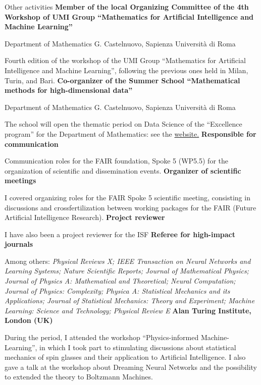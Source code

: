 \begin{rubric}{Other activities}
  \textbf{Member of the local Organizing Committee of the 4th Workshop of UMI Group ``Mathematics for Artificial Intelligence and Machine Learning''}\par Department of Mathematics G. Castelnuovo, Sapienza Università di Roma\par Fourth edition of the workshop of the UMI Group “Mathematics for Artificial Intelligence and Machine Learning”, following the previous ones held in Milan, Turin, and Bari.
  \textbf{Co-organizer of the Summer School ``Mathematical methods for high-dimensional data''}\par Department of Mathematics G. Castelnuovo, Sapienza Università di Roma\par The school will open the thematic period on Data Science of the ``Excellence program'' for the Department of Mathematics: see the \href{https://sites.google.com/view/math-high-dimensional-data/home}{website.}
\entry*[2024 -- today]
  \textbf{Responsible for communication}\par Communication roles for the FAIR foundation, Spoke 5 (WP5.5) for the organization of scientific and dissemination events.
\entry*[2024]
  \textbf{Organizer of scientific meetings}\par I covered organizing roles for the FAIR Spoke 5 scientific meeting, consisting in discussions and crossfertilization between working packages for the FAIR (Future Artificial Intelligence Research).
\entry*[2022]
  \textbf{Project reviewer}\par I have also been a project reviewer for the ISF
\entry*[2017 -- today]
  \textbf{Referee for high-impact journals}\par Among others: \emph{Physical Reviews X; IEEE Transaction on Neural Networks and Learning Systems; Nature Scientific Reports; Journal of Mathematical Physics; Journal of Physics A: Mathematical and Theoretical; Neural Computation; Journal of Physics: Complexity; Physica A: Statistical Mechanics and its Applications; Journal of Statistical Mechanics: Theory and Experiment; Machine Learning: Science and Technology; Physical Review E}
\entry*[16 -- 23 Jan 2023]
  \textbf{Alan Turing Institute, London (UK)}\par During the period, I attended the workshop ``Physics-informed Machine-Learning'', in which I took part to stimulating discussions about statistical mechanics of spin glasses and their application to Artificial Intelligence. I also gave a talk at the workshop about Dreaming Neural Networks and the possibility to extended the theory to Boltzmann Machines.

\end{rubric}
